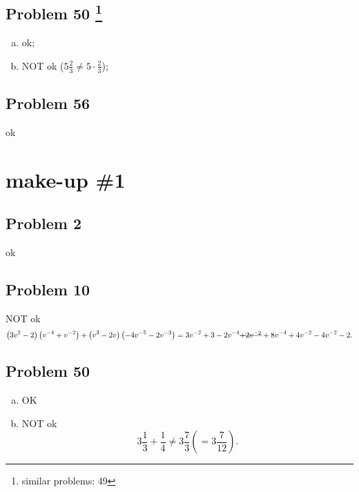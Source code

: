 \documentclass[10pt]{article} %
\begin{document}
\subsection*{Problem 50 \footnote{similar problems: 49}}
\begin{enumerate}[(a)]
	\item ok;
	\item NOT ok ($5\frac{2}{3}\neq 5\cdot\frac{2}{3}$);
\end{enumerate}
\subsection*{Problem 56 }
ok
\section*{make-up \#1}
\subsection*{Problem 2}
ok
\subsection*{Problem 10}
NOT ok
\begin{equation*}
	\left( 3v^2-2 \right)\left( v^{-4}+v^{-2} \right)+\left( v^3-2v \right)\left( -4v^{-5}-2v^{-3}
	\right)=3v^{-2}+3-2v^{-4}\mbox{\sout{$+2v^{-2}$}}+8v^{-4}+4v^{-2}-4v^{-2}-2.
\end{equation*}
\subsection*{Problem 50}
\begin{enumerate}[(a)]
	\item OK
	\item NOT ok\begin{equation*}
			3\frac{1}{3}+\frac{1}{4}\neq 3\frac{7}{3}\left( =3\frac{7}{12} \right).
		\end{equation*}
\end{enumerate}
\end{document}
